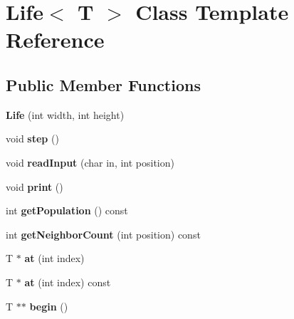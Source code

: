 \hypertarget{classLife}{\section{Life$<$ T $>$ Class Template Reference}
\label{classLife}
}
\subsection*{Public Member Functions}
\begin{DoxyCompactItemize}
\item 
\hypertarget{classLife_aa481017182766d2228023c08eeb2ccca}{{\bfseries Life} (int width, int height)}\label{classLife_aa481017182766d2228023c08eeb2ccca}

\item 
\hypertarget{classLife_ad096847c1b28d71138a2b689621cb50d}{void {\bfseries step} ()}\label{classLife_ad096847c1b28d71138a2b689621cb50d}

\item 
\hypertarget{classLife_ab7ab112da0a3584ee96f6746bc59ea6b}{void {\bfseries read\-Input} (char in, int position)}\label{classLife_ab7ab112da0a3584ee96f6746bc59ea6b}

\item 
\hypertarget{classLife_a229482838bcef44942bcc64264210613}{void {\bfseries print} ()}\label{classLife_a229482838bcef44942bcc64264210613}

\item 
\hypertarget{classLife_a3cf66fe8e6e614c4a17874cc4744921f}{int {\bfseries get\-Population} () const }\label{classLife_a3cf66fe8e6e614c4a17874cc4744921f}

\item 
\hypertarget{classLife_af3a454b69c71826cfd971e2cafa1ee97}{int {\bfseries get\-Neighbor\-Count} (int position) const }\label{classLife_af3a454b69c71826cfd971e2cafa1ee97}

\item 
\hypertarget{classLife_a971c586958f37ef55b2d21793b3de430}{T $\ast$ {\bfseries at} (int index)}\label{classLife_a971c586958f37ef55b2d21793b3de430}

\item 
\hypertarget{classLife_a00e3429d347f06866100ad3c53922324}{T $\ast$ {\bfseries at} (int index) const }\label{classLife_a00e3429d347f06866100ad3c53922324}

\item 
\hypertarget{classLife_a7d9aadc616c6577e10f6bc7849dd9432}{T $\ast$$\ast$ {\bfseries begin} ()}\label{classLife_a7d9aadc616c6577e10f6bc7849dd9432}


\end{DoxyCompactItemize}
